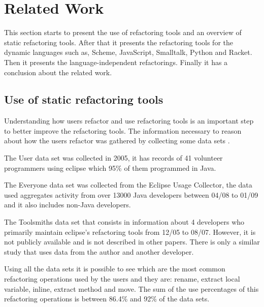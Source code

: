 
% 
% 

\section{Related Work}


This section starts to present the use of refactoring tools and an overview of static refactoring tools.
After that it presents the refactoring tools for the dynamic languages such as, Scheme, JavaScript, Smalltalk, Python and Racket.
Then it presents the language-independent refactorings.
Finally it has a conclusion about the related work.

\subsection{Use of static refactoring tools}

Understanding how users refactor and use refactoring tools is an important step to better improve the refactoring tools.
The information necessary to reason about how the users refactor was gathered by collecting some data sets \cite{murphy2012we}.


The User data set was collected \cite{murphy2006java} in 2005, it has records of 41 volunteer programmers using eclipse which 95\% of them programmed in Java. %

The Everyone data set was collected from the Eclipse Usage Collector, the data used aggregates activity from over 13000 Java developers between 04/08 to 01/09 and it also includes non-Java developers.

The Toolsmiths data set that consists in information about 4 developers who primarily maintain eclipse's refactoring tools from 12/05 to 08/07. 
However, it is not publicly available and is not described in other papers.
There is only a similar study \cite{robbes2007mining} that uses data from the author and another developer. 


Using all the data sets it is possible to see which are the most common refactoring operations used by the users and they are: rename, extract local variable, inline, extract method and move. The sum of the use percentages of this refactoring operations is between 86.4\% and 92\% of the data sets. %


